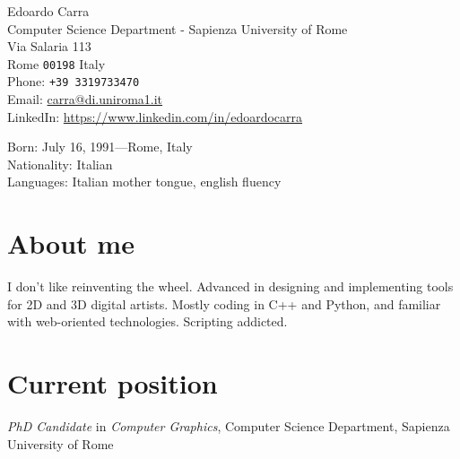 \documentclass[11pt, a4paper]{article} %
\begin{document}

{\LARGE Edoardo Carra}\\[1cm] %

Computer Science Department - Sapienza University of Rome\\ %
Via Salaria 113\\
Rome \texttt{00198}
Italy\\[.2cm]
Phone: \texttt{+39 3319733470}\\ %
Email: \href{mailto:carra@di.uniroma1.it}{carra@di.uniroma1.it}\\ %
LinkedIn: \href{https://www.linkedin.com/in/edoardocarra/}{https://www.linkedin.com/in/edoardocarra}\\ %

\vfill %


Born: July 16, 1991---Rome, Italy\\ %
Nationality: Italian\\ %
Languages: Italian mother tongue, english fluency\\

\section*{About me}

I don't like reinventing the wheel. Advanced in designing and implementing tools for 2D and 3D digital artists. Mostly coding in C++ and Python, and familiar with web-oriented technologies.
Scripting addicted.


\section*{Current position}

\emph{PhD Candidate} in \emph{Computer Graphics}, Computer Science Department, Sapienza University of Rome %
\end{document}
